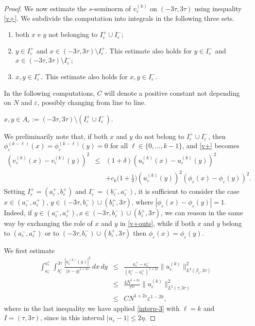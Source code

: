 \documentclass{article}
\newcommand{\e}{\varepsilon}
\begin{document}
\begin{proof}
We now estimate the $s$-seminorm of $v_\e^{(k)}$ on $(-3\tau, 3\tau)$ using inequality \eqref{v+}.
We subdivide the computation into integrals in the following three sets.
\begin{enumerate}
\item both $x$ e $y$ not belonging to $I_\e^{+}\cup I_\e^{-}$;
\item $y\in I^+_\e$ and $x\in (-3\tau,3\tau)\setminus I^+_\e$. This estimate also holds for $y\in I^-_\e$ and $x\in (-3\tau,3\tau)\setminus I^-_\e$;
\item $x,y\in I_\e^+$. This estimate also holds for $x,y\in I_\e^-$.
\end{enumerate}


In the following computations, $C$ will denote a positive constant not depending on $N$ and  $\e$, possibly changing from line to line.


\medskip

 $x,y\in A_\e:=(-3\tau,3\tau)\setminus (I_\e^+\cup I_\e^-)$. 

\smallskip
We preliminarily note that, if both $x$ and $y$ do not belong to $I_\e^+\cup I_\e^-$, then 
$\phi_\e^{(k-\ell)}(x)=\phi_\e^{(k-\ell)}(y)=0$ for all $\ell\in\{0,\dots,k-1\}$, and \eqref{v+} becomes 
\begin{eqnarray}\label{v+outs}
(v_\e^{(k)}(x)-v_\e^{(k)}(y))^2&\leq&(1+\delta)(u_\e^{(k)}(x)-u_\e^{(k)}(y))^2
\nonumber\\
&&+c_k\Big(1+\frac{1}{\delta}\Big)(u_\e^{(k)}(y))^2
(\phi_\e(x)-\phi_\e(y))^2.
\end{eqnarray}
Setting $I_\e^+=(a^+_\e,b^+_\e)$ and $I_\e^-=(b^-_\e,a^-_\e)$, it is sufficient to consider the case $x\in (a^-_\e, a^+_\e)$, $y\in (-3\tau, b_\e^-)\cup (b_\e^+,3\tau)$, where $|\phi_\e(x)-\phi_\e(y)|=1$. 
Indeed, if $y\in (a^-_\e, a^+_\e), x\in (-3\tau, b_\e^-)\cup (b_\e^+,3\tau)$, we can reason in the same way by exchanging the role of $x$ and $y$ in \eqref{v+outs}, while 
if both $x$ and $y$ belong to $(a^-_\e, a^+_\e)$ or to $(-3\tau, b_\e^-)\cup (b_\e^+,3\tau)$ then $\phi_\e(x)=\phi_\e(y)$. 


We first estimate
\begin{eqnarray}%
\int_{a^-_\e}^{a^+_\e}\int_{b^+_\e}^{3\tau}\frac{|u_\e^{(k)}(y)|^2}{|x-y|^{1+2s}}\, dx\,dy
&\leq& 
\frac{a_\e^+-a_\e^-}{(b^+_\e-a^+_\e)^{1+2s}}\|u_\e^{(k)}\|^2_{L^2(\beta_\e,3\tau)}\nonumber\\
&\leq& \frac{4N^{1+2s}}{\tau^{2s}}\|u_\e^{(k)}\|^2_{L^2(\tau,3\tau)}\nonumber\\
&\leq&CN^{1+2s}\e^{1-2k}\nonumber, 
\end{eqnarray} 
where in the last inequality we have applied \eqref{interp-3} with $\ell=k$ and $I=(\tau,3\tau)$,  since in this interval  $|u_\e-1|\leq 2\eta$. 


\end{proof}
\end{document}
